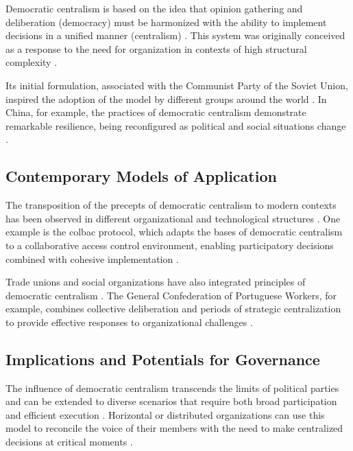 Democratic centralism is based on the idea that opinion gathering and
deliberation (democracy) must be harmonized with the ability to implement
decisions in a unified manner (centralism)
\cite{ACenturyofDemocraticCentralism}. This system was originally conceived as a
response to the need for organization in contexts of high structural complexity
\cite{StillaCenturyoftheChineseModel,EstatutosDoPCP}.

Its initial formulation, associated with the Communist Party of the Soviet
Union, inspired the adoption of the model by different groups around the world
\cite{StillaCenturyoftheChineseModel}. In China, for example, the practices of democratic
centralism demonstrate remarkable resilience, being reconfigured as political
and social situations change \cite{ACenturyofDemocraticCentralism}.

\subsection{Contemporary Models of Application}
\label{subsec:contemporary_models_application}

The transposition of the precepts of democratic centralism to modern contexts
has been observed in different organizational and technological structures
\cite{DoArtifactsHavePolitics, Colbac}. One example is the \gls{colbac}
protocol, which adapts the bases of democratic centralism to a collaborative
access control environment, enabling participatory decisions combined with
cohesive implementation \cite{Colbac}.

Trade unions and social organizations have also integrated principles of
democratic centralism \cite{CGTPStatutes}. The General Confederation of
Portuguese Workers, for example, combines collective deliberation and periods of
strategic centralization to provide effective responses to organizational
challenges \cite{CGTPStatutes}.

\subsection{Implications and Potentials for Governance}
\label{subsec:implications_potentials_governance}

The influence of democratic centralism transcends the limits of political
parties and can be extended to diverse scenarios that require both broad
participation and efficient execution \cite{ACenturyofDemocraticCentralism,
TheCostsofConnection}. Horizontal or distributed organizations can use this
model to reconcile the voice of their members with the need to make centralized
decisions at critical moments
\cite{StillaCenturyoftheChineseModel,ACenturyofDemocraticCentralism}.

